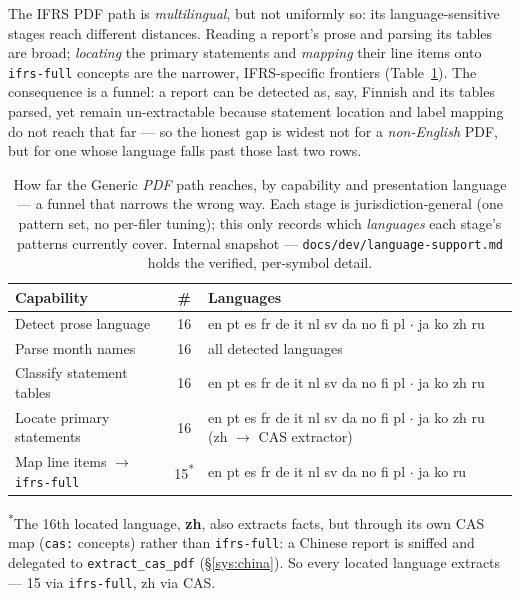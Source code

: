 \documentclass[11pt,a4paper]{report}
\begin{document}
The IFRS PDF path is \emph{multilingual}, but not uniformly so: its language-sensitive stages reach different
distances. Reading a report's prose and parsing its tables are broad; \emph{locating} the primary statements
and \emph{mapping} their line items onto \texttt{ifrs-full} concepts are the narrower, IFRS-specific frontiers
(Table~\ref{tab:generic-langs}). The consequence is a funnel: a report can be detected as, say, Finnish and its
tables parsed, yet remain un-extractable because statement location and label mapping do not reach that far ---
so the honest gap is widest not for a \emph{non-English} PDF, but for one whose language falls past those last
two rows.

\begin{table}[h]
\centering
\small
\caption{How far the Generic \emph{PDF} path reaches, by capability and presentation language --- a funnel that
narrows the wrong way. Each stage is jurisdiction-general (one pattern set, no per-filer tuning); this only
records which \emph{languages} each stage's patterns currently cover. Internal snapshot ---
\texttt{docs/dev/language-support.md} holds the verified, per-symbol detail.}
\label{tab:generic-langs}
\begin{tabular}{@{}p{}cp{}@{}}
\toprule
\textbf{Capability} & \textbf{\#} & \textbf{Languages} \\
\midrule
Detect prose language & 16 & en pt es fr de it nl sv da no fi pl \(\cdot\) ja ko zh ru \\
Parse month names & 16 & all detected languages \\
Classify statement tables & 16 & en pt es fr de it nl sv da no fi pl \(\cdot\) ja ko zh ru \\
Locate primary statements & 16 & en pt es fr de it nl sv da no fi pl \(\cdot\) ja ko zh ru (zh $\to$ CAS extractor) \\
Map line items \(\rightarrow\) \texttt{ifrs-full} & 15\textsuperscript{*} & en pt es fr de it nl sv da no fi pl \(\cdot\) ja ko ru \\
\bottomrule
\end{tabular}

\vspace{2pt}
{\footnotesize \textsuperscript{*}The 16th located language, \textbf{zh}, also extracts facts, but through its
own CAS map (\texttt{cas:} concepts) rather than \texttt{ifrs-full}: a Chinese report is sniffed and delegated
to \texttt{extract\_cas\_pdf} (\S\ref{sys:china}). So every located language extracts --- 15 via \texttt{ifrs-full},
zh via CAS.}
\end{table}
\end{document}
